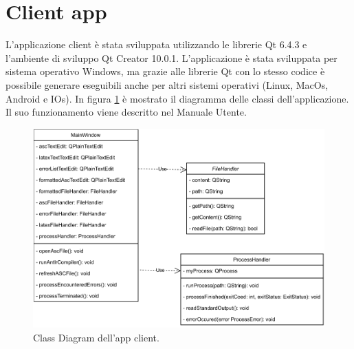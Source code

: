 \section{Client app}
L'applicazione client è stata sviluppata utilizzando le librerie Qt 6.4.3 e l'ambiente di sviluppo Qt Creator 10.0.1. L'applicazione è stata sviluppata per sistema operativo Windows, ma grazie alle librerie Qt con lo stesso codice è possibile generare eseguibili anche per altri sistemi operativi (Linux, MacOs, Android e IOs). In figura \ref{fig:class_diagram_client} è mostrato il diagramma delle classi dell'applicazione. Il suo funzionamento viene descritto nel Manuale Utente.

\begin{figure}[h!]
	\centering
	\includegraphics[width=\textwidth]{./ImageFiles/client app diagram}
	\caption{Class Diagram dell'app client.}
	\label{fig:class_diagram_client}
\end{figure}

\clearpage

